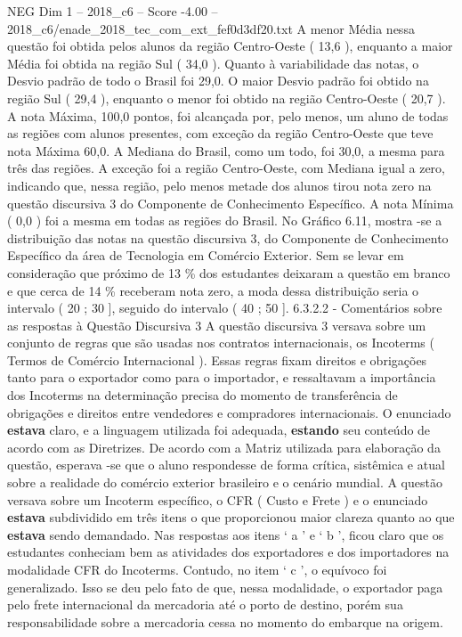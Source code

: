 \begin{textsample}{NEG Dim 1 – 2018\_c6 – Score -4.00 – 2018\_c6/enade\_2018\_tec\_com\_ext\_fef0d3df20.txt}
A menor Média nessa questão foi obtida pelos alunos da região Centro-Oeste ( 13,6 ), enquanto a maior Média foi obtida na região Sul ( 34,0 ).
Quanto à variabilidade das notas, o Desvio padrão de todo o Brasil foi 29,0.
O maior Desvio padrão foi obtido na região Sul ( 29,4 ), enquanto o menor foi obtido na região Centro-Oeste ( 20,7 ).
A nota Máxima, 100,0 pontos, foi alcançada por, pelo menos, um aluno de todas as regiões com alunos presentes, com exceção da região Centro-Oeste que teve nota Máxima 60,0.
A Mediana do Brasil, como um todo, foi 30,0, a mesma para três das regiões.
A exceção foi a região Centro-Oeste, com Mediana igual a zero, indicando que, nessa região, pelo menos metade dos alunos tirou nota zero na questão discursiva 3 do Componente de Conhecimento Específico.
A nota Mínima ( 0,0 ) foi a mesma em todas as regiões do Brasil.
No Gráfico 6.11, mostra -se a distribuição das notas na questão discursiva 3, do Componente de Conhecimento Específico da área de Tecnologia em Comércio Exterior.
Sem se levar em consideração que próximo de 13 \% dos estudantes deixaram a questão em branco e que cerca de 14 \% receberam nota zero, a moda dessa distribuição seria o intervalo ( 20 ; 30 ], seguido do intervalo ( 40 ; 50 ]. 6.3.2.2 - Comentários sobre as respostas à Questão Discursiva 3 A questão discursiva 3 versava sobre um conjunto de regras que são usadas nos contratos internacionais, os Incoterms ( Termos de Comércio Internacional ).
Essas regras fixam direitos e obrigações tanto para o exportador como para o importador, e ressaltavam a importância dos Incoterms na determinação precisa do momento de transferência de obrigações e direitos entre vendedores e compradores internacionais.
O enunciado \textbf{estava} claro, e a linguagem utilizada foi adequada, \textbf{estando} seu conteúdo de acordo com as Diretrizes.
De acordo com a Matriz utilizada para elaboração da questão, esperava -se que o aluno respondesse de forma crítica, sistêmica e atual sobre a realidade do comércio exterior brasileiro e o cenário mundial.
A questão versava sobre um Incoterm específico, o CFR ( Custo e Frete ) e o enunciado \textbf{estava} subdividido em três itens o que proporcionou maior clareza quanto ao que \textbf{estava} sendo demandado.
Nas respostas aos itens ‘ a ’ e ‘ b ’, ficou claro que os estudantes conheciam bem as atividades dos exportadores e dos importadores na modalidade CFR do Incoterms.
Contudo, no item ‘ c ’, o equívoco foi generalizado.
Isso se deu pelo fato de que, nessa modalidade, o exportador paga pelo frete internacional da mercadoria até o porto de destino, porém sua responsabilidade sobre a mercadoria cessa no momento do embarque na origem.

\end{textsample}
